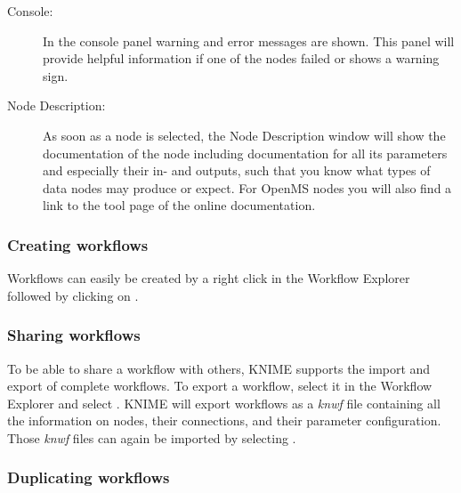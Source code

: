 \begin{description}
\item[Console:]
In the console panel warning and error messages are shown.
This panel will provide helpful information if one of the nodes failed or shows a warning sign.

\item[Node Description:]
As soon as a node is selected, the Node Description window will show the documentation of the node including 
documentation for all its parameters and especially their in- and outputs, such that you know what types of data 
nodes may produce or expect.
For OpenMS nodes you will also find a link to the tool page of the online documentation.

\end{description}

\subsubsection{Creating workflows}
\label{sec:create_workflows}

Workflows can easily be created by a right click in the Workflow Explorer followed by clicking on .

\subsubsection{Sharing workflows}
\label{sec:sharing_workflows}

To be able to share a workflow with others, KNIME supports the import and export of complete workflows.
To export a workflow, select it in the Workflow Explorer and select .
KNIME will export workflows as a \textit{knwf} file containing all the information on nodes, their connections, and their parameter configuration.
Those \textit{knwf} files can again be imported by selecting .


\subsubsection{Duplicating workflows}
\label{sec:duplicate-wf}

